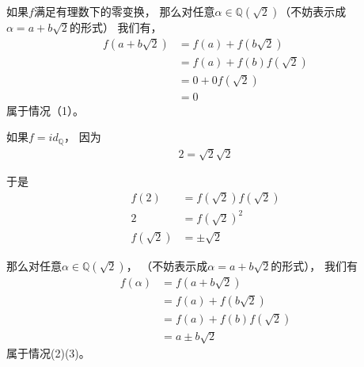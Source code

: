 \documentclass{article}
\begin{document}
如果$f$满足有理数下的零变换，
那么对任意$\alpha \in \mathbb{Q}(\sqrt{2})$（不妨表示成$\alpha = a + b\sqrt{2}$的形式）
我们有，
\begin{align*}
      f(a + b\sqrt{2})
       & = f(a) + f(b\sqrt{2})    \\
       & = f(a) + f(b)f(\sqrt{2}) \\
       & = 0 + 0f(\sqrt{2})       \\
       & = 0
\end{align*}
属于情况（1）。

如果$f = id_{\mathbb{Q}}$，
因为
\begin{align*}
      2 = \sqrt{2} \sqrt{2}
\end{align*}

于是
\begin{align*}
      f(2)        & = f(\sqrt{2}) f(\sqrt{2}) \\
      2           & = f(\sqrt{2})^2           \\
      f(\sqrt{2}) & = \pm \sqrt{2}
\end{align*}

那么对任意$\alpha \in \mathbb{Q}(\sqrt{2})$，
（不妨表示成$\alpha = a + b\sqrt{2}$的形式），
我们有
\begin{align*}
      f(\alpha) & = f(a + b\sqrt{2})        \\
                & = f(a) + f(b\sqrt{2})     \\
                & = f(a) + f(b) f(\sqrt{2}) \\
                & = a \pm b \sqrt{2}
\end{align*}
属于情况(2)(3)。
\end{document}
